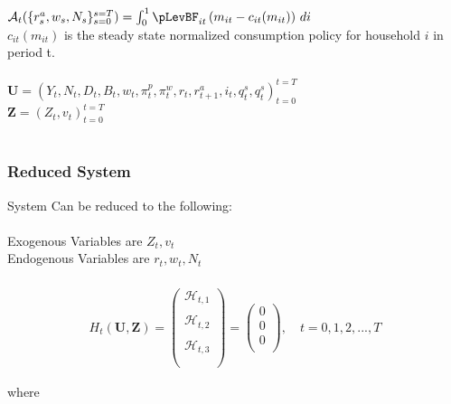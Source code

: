 \documentclass[titlepage]{\econtex}\providecommand{\texname}{BufferStockTheory}
\begin{document}
 $\mathcal{A}_{t}(\{r_{s}^{a} ,w_{s}, N_{s}\}_{s=0}^{s=T}) = \int_{0}^{1} \pLevBF_{it} \left(m_{it} - c_{it}(m_{it})\right)\, di $ \\
 
$c_{it}(m_{it})$ is the steady state normalized consumption policy for household $i$ in period t. \\ \\
 

 
 
 $\mathbf{U} = \left(Y_{t} , N_{t} ,  D_{t
 }, B_{t}, w_{t} , \pi_{t}^{p} ,\pi_{t}^{w}, r_{t} , r_{t+1}^{a}, i_{t} , q_{t}^{s},  q_{t}^{s} \right)_{t=0}^{t=T}$ \\ 

 
 $\mathbf{Z} = \left(Z_{t} ,v_{t}\right)_{t=0}^{t=T}$ \\ \\
 
 
\hypertarget{Reduced System}{}
\subsubsection{Reduced System}
 
 System Can be reduced to the following: \\ \\
 
Exogenous Variables are $ Z_{t}, v_{t}$ \\ 

Endogenous Variables are $ r_{t} , w_{t} ,N_{t}$ \\ \\

\begin{eqnarray} 
H_{t}(\mathbf{U},\mathbf{Z})= \begin{pmatrix} 
\mathcal{H}_{t,1} \\ \\ 
\mathcal{H}_{t,2} \\ \\
\mathcal{H}_{t,3} \\ \\
 \end{pmatrix} = \begin{pmatrix} 0 \\ 0 \\ 0 \\ \end{pmatrix} , \quad  t = 0, 1, 2, ..., T 
 \end{eqnarray}
 
 where \\ 
 
\end{document}
